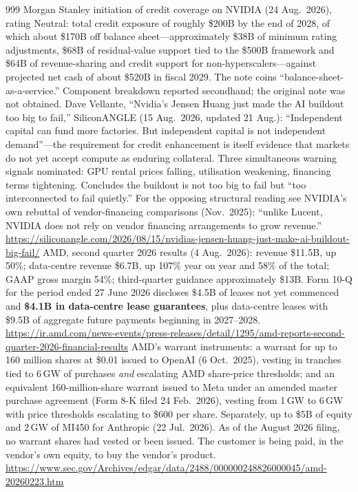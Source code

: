 \begin{thebibliography}{999}
 Morgan Stanley initiation of credit coverage on NVIDIA (24 Aug.\ 2026), rating Neutral: total credit exposure of roughly \$200B by the end of 2028, of which about \$170B off balance sheet---approximately \$38B of minimum rating adjustments, \$68B of residual-value support tied to the \$500B framework and \$64B of revenue-sharing and credit support for non-hyperscalers---against projected net cash of about \$520B in fiscal 2029. The note coins ``balance-sheet-as-a-service.'' Component breakdown reported secondhand; the original note was not obtained.
 Dave Vellante, ``Nvidia's Jensen Huang just made the AI buildout too big to fail,'' SiliconANGLE (15 Aug.\ 2026, updated 21 Aug.): ``Independent capital can fund more factories. But independent capital is not independent demand''---the requirement for credit enhancement is itself evidence that markets do not yet accept compute as enduring collateral. Three simultaneous warning signals nominated: GPU rental prices falling, utilisation weakening, financing terms tightening. Concludes the buildout is not too big to fail but ``too interconnected to fail quietly.'' For the opposing structural reading see NVIDIA's own rebuttal of vendor-financing comparisons (Nov.\ 2025): ``unlike Lucent, NVIDIA does not rely on vendor financing arrangements to grow revenue.'' \url{https://siliconangle.com/2026/08/15/nvidias-jensen-huang-just-make-ai-buildout-big-fail/}
 AMD, second quarter 2026 results (4 Aug.\ 2026): revenue \$11.5B, up 50\%; data-centre revenue \$6.7B, up 107\% year on year and 58\% of the total; GAAP gross margin 54\%; third-quarter guidance approximately \$13B. Form 10-Q for the period ended 27 June 2026 discloses \$4.5B of leases not yet commenced and \textbf{\$4.1B in data-centre lease guarantees}, plus data-centre leases with \$9.5B of aggregate future payments beginning in 2027--2028. \url{https://ir.amd.com/news-events/press-releases/detail/1295/amd-reports-second-quarter-2026-financial-results}
 AMD's warrant instruments: a warrant for up to 160 million shares at \$0.01 issued to OpenAI (6 Oct.\ 2025), vesting in tranches tied to 6\,GW of purchases \emph{and} escalating AMD share-price thresholds; and an equivalent 160-million-share warrant issued to Meta under an amended master purchase agreement (Form 8-K filed 24 Feb.\ 2026), vesting from 1\,GW to 6\,GW with price thresholds escalating to \$600 per share. Separately, up to \$5B of equity and 2\,GW of MI450 for Anthropic (22 Jul.\ 2026). As of the August 2026 filing, no warrant shares had vested or been issued. The customer is being paid, in the vendor's own equity, to buy the vendor's product. \url{https://www.sec.gov/Archives/edgar/data/2488/000000248826000045/amd-20260223.htm}

\end{thebibliography}
